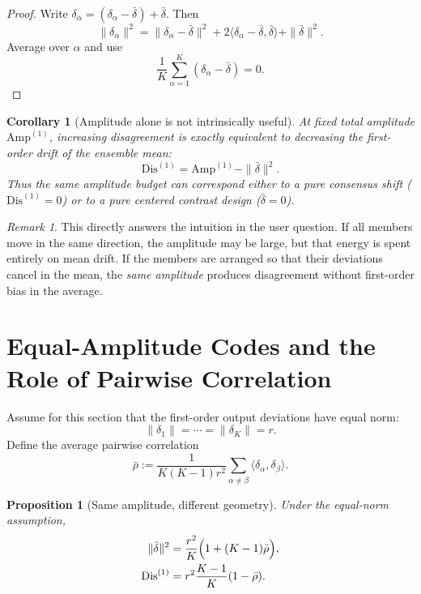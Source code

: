 \documentclass[11pt]{article}
\newtheorem{proposition}[theorem]{Proposition}
\newtheorem{corollary}[theorem]{Corollary}
\theoremstyle{remark}
\newtheorem{remark}[theorem]{Remark}
\begin{document}
\begin{proof}
Write $\delta_\alpha=(\delta_\alpha-\bar\delta)+\bar\delta$. Then
\[
\|\delta_\alpha\|^2
=
\|\delta_\alpha-\bar\delta\|^2
+ 2\langle \delta_\alpha-\bar\delta,\bar\delta\rangle
+ \|\bar\delta\|^2.
\]
Average over $\alpha$ and use
\[
\frac1K\sum_{\alpha=1}^K (\delta_\alpha-\bar\delta)=0.
\]
\end{proof}

\begin{corollary}[Amplitude alone is not intrinsically useful]
\label{cor:amplitude-not-enough}
At fixed total amplitude $\mathrm{Amp}^{(1)}$, increasing disagreement is exactly equivalent to decreasing the first-order drift of the ensemble mean:
\[
\mathrm{Dis}^{(1)} = \mathrm{Amp}^{(1)} - \|\bar\delta\|^2.
\]
Thus the same amplitude budget can correspond either to a pure consensus shift ($\mathrm{Dis}^{(1)}=0$) or to a pure centered contrast design ($\bar\delta=0$).
\end{corollary}

\begin{remark}
This directly answers the intuition in the user question. If all members move in the same direction, the amplitude may be large, but that energy is spent entirely on mean drift. If the members are arranged so that their deviations cancel in the mean, the \emph{same amplitude} produces disagreement without first-order bias in the average.
\end{remark}

\section{Equal-Amplitude Codes and the Role of Pairwise Correlation}

Assume for this section that the first-order output deviations have equal norm:
\[
\|\delta_1\|=\cdots=\|\delta_K\|=r.
\]
Define the average pairwise correlation
\[
\bar\rho
:=
\frac{1}{K(K-1)r^2}
\sum_{\alpha\neq\beta}
\langle \delta_\alpha,\delta_\beta\rangle.
\]

\begin{proposition}[Same amplitude, different geometry]
\label{prop:pairwise-correlation}
Under the equal-norm assumption,
\begin{align}
\|\bar\delta\|^2
&=
\frac{r^2}{K}\Bigl(1+(K-1)\bar\rho\Bigr),
\label{eq:mean-via-rho}\\
\mathrm{Dis}^{(1)}
&=
r^2 \frac{K-1}{K}(1-\bar\rho).
\label{eq:dis-via-rho}
\end{align}
\end{proposition}
\end{document}
